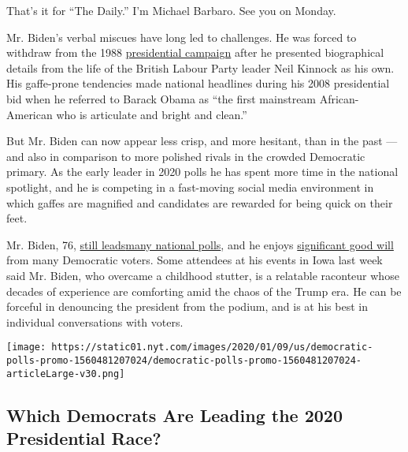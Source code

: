 That's it for ``The Daily.'' I'm Michael Barbaro. See you on Monday.

Mr. Biden's verbal miscues have long led to challenges. He was forced to
withdraw from the 1988
\href{https://www.nytimes.com/2019/06/03/us/politics/biden-1988-presidential-campaign.html}{presidential
campaign} after he presented biographical details from the life of the
British Labour Party leader Neil Kinnock as his own. His gaffe-prone
tendencies made national headlines during his 2008 presidential bid when
he referred to Barack Obama as ``the first mainstream African-American
who is articulate and bright and clean.''

But Mr. Biden can now appear less crisp, and more hesitant, than in the
past --- and also in comparison to more polished rivals in the crowded
Democratic primary. As the early leader in 2020 polls he has spent more
time in the national spotlight, and he is competing in a fast-moving
social media environment in which gaffes are magnified and candidates
are rewarded for being quick on their feet.

Mr. Biden, 76,
\href{https://www.realclearpolitics.com/epolls/2020/president/us/2020_democratic_presidential_nomination-6730.html\#polls}{still
leads}\href{https://www.cnn.com/2019/10/23/politics/cnn-poll-biden-lead-increases/index.html}{many
national polls}, and he enjoys
\href{https://www.nytimes.com/2019/05/30/us/politics/joe-biden-beau-biden-death.html}{significant
good will} from many Democratic voters. Some attendees at his events in
Iowa last week said Mr. Biden, who overcame a childhood stutter, is a
relatable raconteur whose decades of experience are comforting amid the
chaos of the Trump era. He can be forceful in denouncing the president
from the podium, and is at his best in individual conversations with
voters.

\href{https://www.nytimes.com/interactive/2020/us/elections/democratic-polls.html}{}

\texttt{[image: https://static01.nyt.com/images/2020/01/09/us/democratic-polls-promo-1560481207024/democratic-polls-promo-1560481207024-articleLarge-v30.png]}

\hypertarget{which-democrats-are-leading-the-2020-presidential-race}{%
\subsection{Which Democrats Are Leading the 2020 Presidential
Race?}\label{which-democrats-are-leading-the-2020-presidential-race}}

